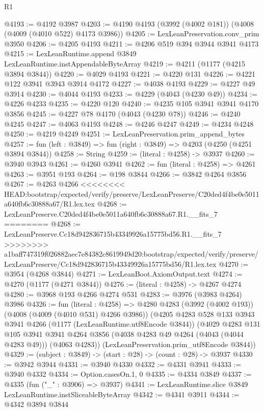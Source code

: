 \begin{lexlean}{R1}
\begin{coremodule}
{{{{{{{{{{{{{{{{{{{{{{{{{{{{{{{{{{{{{{{{{{{{{{{{{{{{{{{{{{{{{{{{{{{{{{{{{{{{{{{{{{{{{{{{{{{{{{{{{{{{{{{{{{{{{{{{{{{{{{{{{{{{{{{{{{{{{{{{{{{{{{{{{{{{{{{{{{{{{{{{{{{{{{{{{{{{{{{{{{{{{{{{{{@4193 := @4192 @3987
@4203 := @4190 @4193 (@3992 (@4002 @181)) (@4008 (@4009 (@4010 @522) @4173 @3986))
@4205 := LexLeanPreservation.conv_prim @3950
@4206 := @4205 @4193
@4211 := @4206 @519 @394 @3944 @3941 @4173
@4215 := LexLeanRuntime.append @3849 LexLeanRuntime.instAppendableByteArray
@4219 := @4211 (@1177 (@4215 @3894 @3844))
@4220 := @4029 @4193
@4221 := @4220 @131
@4226 := @4221 @122 @3941 @3943 @3914 @4172
@4227 := @4038 @4193
@4229 := @4227 @49 @3914
@4230 := @4044 @4193
@4233 := @4229 (@4043 (@4230 @49))
@4234 := @4226 @4233
@4235 := @4220 @120
@4240 := @4235 @105 @3941 @3941 @4170 @3856
@4245 := @4227 @78 @4170 (@4043 (@4230 @78))
@4246 := @4240 @4245
@4247 := @4063 @4193
@4248 := @4246 @4247
@4249 := @4234 @4248
@4250 := @4219 @4249
@4251 := LexLeanPreservation.prim_append_bytes
@4257 := fun (left : @3849) => fun (right : @3849) => @4203 (@4250 (@4251 @3894 @3844))
@4258 := String
@4259 := (literal : @4258) -> @3937
@4260 := @3940 @3943
@4261 := @4260 @3941
@4262 := fun (literal : @4258) => @4261
@4263 := @3951 @193
@4264 := @198 @3844
@4266 := @3842 @4264 @3856
@4267 := @4263 @4266
<<<<<<<< HEAD:bootstrap/expected/verify/preserve/LexLeanPreserve/C20ded4f4be0e5011a640fb6c30888a67/R1.lex.tex
@4268 := LexLeanPreserve.C20ded4f4be0e5011a640fb6c30888a67.R1.__fits_7
========
@4268 := LexLeanPreserve.Cc18d942836715b43349926a15775bd56.R1.__fits_7
>>>>>>>> a1baff747319f026882aec7e84382c8619949d20:bootstrap/expected/verify/preserve/LexLeanPreserve/Cc18d942836715b43349926a15775bd56/R1.lex.tex
@4270 := @3954 (@4268 @3844)
@4271 := LexLeanBoot.AxiomOutput.text
@4274 := @4270 (@1177 (@4271 @3844))
@4276 := (literal : @4258) -> @4267 @4274
@4280 := @3968 @193 @4266 @4274 @531
@4283 := @3976 (@3983 @4264) @3986
@4326 := fun (literal : @4258) =>
  @4280
    @4283
    (@3992 (@4002 @193))
    (@4008 (@4009 (@4010 @531) @4266 @3986))
    (@4205
      @4283
      @528
      @133
      @3943
      @3941
      @4266
      (@1177 (LexLeanRuntime.utf8Encode @3844))
      (@4029
        @4283
        @131
        @105
        @3941
        @3941
        @4264
        @3856
        (@4038 @4283 @49 @4264 (@4043 (@4044 @4283 @49)))
        (@4063 @4283))
      (LexLeanPreservation.prim_utf8Encode @3844))
@4329 := (subject : @3849) -> (start : @28) -> (count : @28) -> @3937
@4330 := @3942 @3944
@4331 := @3940 @4330
@4332 := @4331 @3941
@4333 := @3940 @4332
@4334 := Option.casesOn.{1, 0}
@4335 := @4334 @3849
@4337 := @4335 (fun ("_" : @3906) => @3937)
@4341 := LexLeanRuntime.slice @3849 LexLeanRuntime.instSliceableByteArray
@4342 := @4341 @3911
@4344 := @4342 @3894 @3844
}}}}}}}}}}}}}}}}}}}}}}}}}}}}}}}}}}}}}}}}}}}}}}}}}}}}}}}}}}}}}}}}}}}}}}}}}}}}}}}}}}}}}}}}}}}}}}}}}}}}}}}}}}}}}}}}}}}}}}}}}}}}}}}}}}}}}}}}}}}}}}}}}}}}}}}}}}}}}}}}}}}}}}}}}}}}}}}}}}}}}}}}}}
\end{coremodule}
\end{lexlean}
